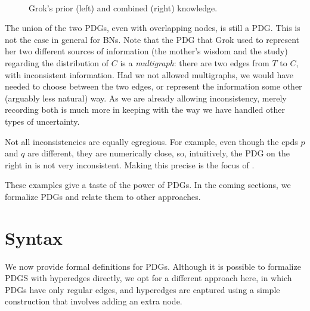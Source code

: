 \begin{example}
\begin{figure}
	\fi
	\hfill~
	\caption{Grok's prior (left) and combined (right) knowledge.}
	\label{fig:grok-combine}
\end{figure}

The union of the two PDGs, even with overlapping 
nodes, is still a PDG.
This is not the case in general
for BNs.
Note that the PDG that Grok used to
represent her two different sources of information (the mother's wisdom and the
study) regarding the distribution of $C$ is a \emph{multigraph}: there are two
edges from $T$ to $C$, with inconsistent information.
Had we not allowed multigraphs, we would have needed to choose between the two edges, or represent the
information some other (arguably less natural) way. As we are already allowing
inconsistency, merely recording both is much more in keeping with the way we
have handled other types of uncertainty. 
\end{example}

Not all inconsistencies are equally egregious. For example, even though the cpds
$p$ and $q$ are different, they are numerically close, so, intuitively, the PDG on the right in
 is not very inconsistent.
Making this precise 
is
the focus of .


        
These examples give a taste of the power of PDGs.  In the coming sections, we formalize PDGs and relate them to other approaches.		
	
	
\section{Syntax}\label{sec:formal+syntax}
We now provide formal definitions for PDGs.        
Although it is possible to formalize PDGS with hyperedges directly,
    we opt for a different approach here, in which PDGs have only regular edges,
and hyperedges are captured using a simple construction
that involves adding an extra node.
%

